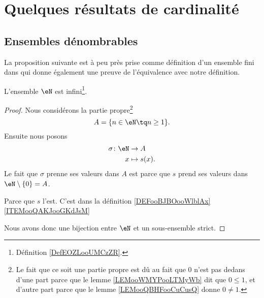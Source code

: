 
\section{Quelques résultats de cardinalité}

\subsection{Ensembles dénombrables}


La proposition suivante est à peu près prise comme définition d'un ensemble fini dans \cite{ooVAYLooJxVYex} qui donne également une preuve de l'équivalence avec notre définition.
\begin{proposition}     \label{PROPooBYKCooGDkfWy}
	L'ensemble \( \eN\) est infini\footnote{Définition \ref{DefEOZLooUMCzZR}.}.
\end{proposition}

\begin{proof}
	Nous considérons la partie propre\footnote{Le fait que ce soit une partie propre est dû au fait que \( 0\) n'est pas dedans d'une part parce que le lemme \ref{LEMooWMYPooLTMyWb} dit que \( 0\leq 1\), et d'autre part parce que le lemme \ref{LEMooQBHFooCuCusQ} donne \( 0\neq 1\).}
	\begin{equation}
		A=\{ n\in \eN\tq n\geq 1 \}.
	\end{equation}
	Ensuite nous posons
	\begin{equation}
		\begin{aligned}
			\sigma\colon \eN & \to A         \\
			x                & \mapsto s(x).
		\end{aligned}
	\end{equation}
	Le fait que \( \sigma\) prenne ses valeurs dans \( A\) est parce que \( s\) prend ses valeurs dans \( \eN\setminus\{ 0 \}=A\).
	\begin{subproof}
		Parce que \( s\) l'est.
		C'est dans la définition \ref{DEFooBJBOooWlblAx}\ref{ITEMooQAKJooGKdJsM}
	\end{subproof}
	Nous avons donc une bijection entre \( \eN\) et un sous-ensemble strict.
\end{proof}

